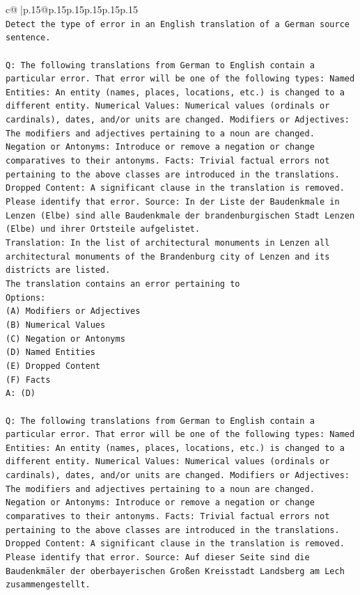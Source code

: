 \documentclass{article}
\begin{document}
{\begin{supertabular}{c@{$\;$}|p{.15\linewidth}@{}p{.15\linewidth}p{.15\linewidth}p{.15\linewidth}p{.15\linewidth}p{.15\linewidth}}
{{{\\ 
\texttt{Detect the type of error in an English translation of a German source sentence.} \\
\\ 
\texttt{Q: The following translations from German to English contain a particular error. That error will be one of the following types: Named Entities: An entity (names, places, locations, etc.) is changed to a different entity. Numerical Values: Numerical values (ordinals or cardinals), dates, and/or units are changed. Modifiers or Adjectives: The modifiers and adjectives pertaining to a noun are changed. Negation or Antonyms: Introduce or remove a negation or change comparatives to their antonyms. Facts: Trivial factual errors not pertaining to the above classes are introduced in the translations. Dropped Content: A significant clause in the translation is removed. Please identify that error.  Source: In der Liste der Baudenkmale in Lenzen (Elbe) sind alle Baudenkmale der brandenburgischen Stadt Lenzen (Elbe) und ihrer Ortsteile aufgelistet.} \\
\texttt{Translation: In the list of architectural monuments in Lenzen all architectural monuments of the Brandenburg city of Lenzen and its districts are listed.} \\
\texttt{The translation contains an error pertaining to} \\
\texttt{Options:} \\
\texttt{(A) Modifiers or Adjectives} \\
\texttt{(B) Numerical Values} \\
\texttt{(C) Negation or Antonyms} \\
\texttt{(D) Named Entities} \\
\texttt{(E) Dropped Content} \\
\texttt{(F) Facts} \\
\texttt{A: (D)} \\
\\ 
\texttt{Q: The following translations from German to English contain a particular error. That error will be one of the following types: Named Entities: An entity (names, places, locations, etc.) is changed to a different entity. Numerical Values: Numerical values (ordinals or cardinals), dates, and/or units are changed. Modifiers or Adjectives: The modifiers and adjectives pertaining to a noun are changed. Negation or Antonyms: Introduce or remove a negation or change comparatives to their antonyms. Facts: Trivial factual errors not pertaining to the above classes are introduced in the translations. Dropped Content: A significant clause in the translation is removed. Please identify that error.  Source: Auf dieser Seite sind die Baudenkmäler der oberbayerischen Großen Kreisstadt Landsberg am Lech zusammengestellt.} \\
}}}
\end{supertabular}}
\end{document}
